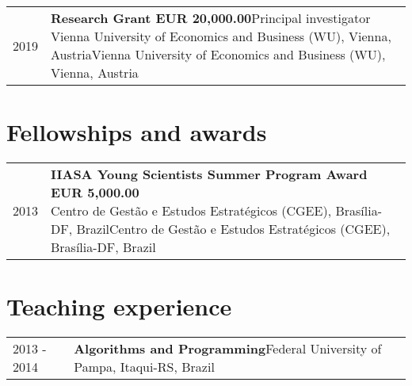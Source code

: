\documentclass[10pt,a4paper,]{article}
\makeatletter
\def\detaileditem#1#2#3#4#5{
#2 & \parbox[t]{0.85\textwidth}{%
      \textbf{#1}\hfill{\footnotesize #3}\\
      \ifx#4\empty\else#4\par\fi%
      \ifx#5\empty\else{%
        \vspace{0.1cm}\begin{minipage}{0.7\textwidth}%
        \begin{itemize}#5\end{itemize}%
        \end{minipage}}\fi%
      \vspace{\parsep}}\\}
\def\detailedsection#1{\begin{longtable}{@{\extracolsep{\fill}}ll}#1\end{longtable}}
\makeatother
\begin{document}
\detailedsection{\detaileditem{Research Grant EUR 20,000.00}{2019}{Principal investigator}{Vienna University of Economics and Business (WU), Vienna, Austria}{\empty}\detaileditem{Educational Project Grant BRL 7,200.00}{2013}{Principal investigator}{Universidade Federal do Pampa (UNIPAMPA), Itaqui, RS, Brazil}{\empty}}

\hypertarget{fellowships-and-awards}{%
\section{Fellowships and awards}\label{fellowships-and-awards}}

\detailedsection{\detaileditem{IIASA Young Scientists Summer Program Award EUR 5,000.00}{2013}{}{Centro de Gestão e Estudos Estratégicos (CGEE), Brasília-DF, Brazil}{\empty}\detaileditem{Master's Full Scholarship Award BRL 28,800.00}{2009}{}{Coordination for the Improvement of Higher Education Personnel (CAPES), Brasília-DF, Brazil}{\empty}\detaileditem{Scholarship Award BRL 6,000.00}{2008}{}{Research Support Foundation of Rio Grande do Sul (FAPERGS), Porto Alegre-RS, Brazil}{\empty}\detaileditem{Scholarship Award BRL 4,800.00}{2007}{}{Franciscan University (UFN), Santa Maria-RS, Brazil}{\empty}\detaileditem{Scholarship Award BRL 4,800.00}{2006}{}{Franciscan University (UFN), Santa Maria-RS, Brazil}{\empty}\detaileditem{Scholarship Award BRL 3,200.00}{2004}{}{Franciscan University (UFN), Santa Maria-RS, Brazil}{\empty}}

\hypertarget{teaching-experience}{%
\section{Teaching experience}\label{teaching-experience}}

\detailedsection{\detaileditem{Algorithms and Programming}{2013 - 2014}{Federal University of Pampa, Itaqui-RS, Brazil}{}{\empty}\detaileditem{Introduction to Informatics}{2013 - 2014}{Federal University of Pampa, Itaqui-RS, Brazil}{}{\empty}\detaileditem{Numerical Analysis}{2013 - 2014}{Federal University of Pampa, Itaqui-RS, Brazil}{}{\empty}\detaileditem{Environmental Management}{2012 - 2012}{Federal University of Pampa, Itaqui-RS, Brazil}{}{\empty}\detaileditem{Informatics}{2012 - 2013}{Federal University of Pampa, Itaqui-RS, Brazil}{}{\empty}\detaileditem{Introduction to Programming}{2012 - 2012}{Federal University of Pampa, Itaqui-RS, Brazil}{}{\empty}\detaileditem{Numerical Analysis}{2010 - 2010}{Federal University of Juiz de Fora, Juiz de Fora-MG, Brazil}{}{\empty}\detaileditem{Programming Laboratory}{2009 - 2010}{Federal University of Juiz de Fora, Juiz de Fora-MG, Brazil}{}{\empty}}
\end{document}

